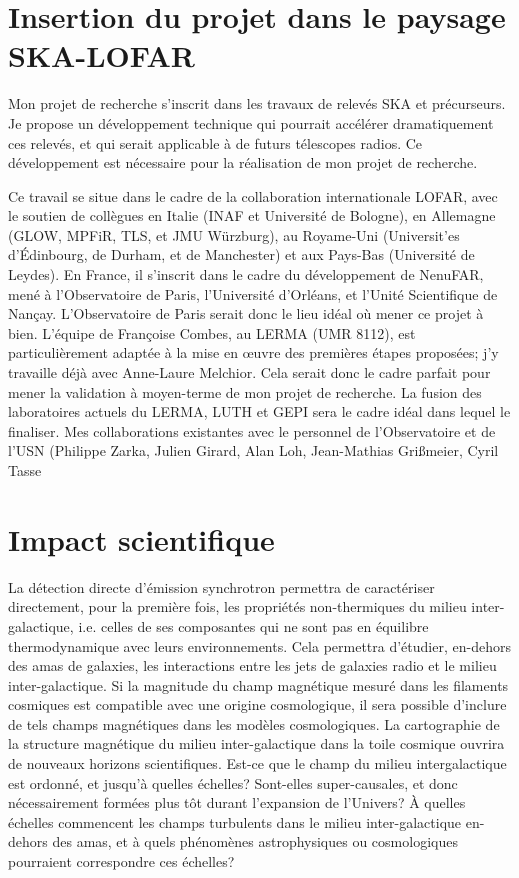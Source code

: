 \newpage

\section{Insertion du projet dans le paysage SKA-LOFAR}

\pg
Mon projet de recherche s'inscrit dans les travaux de relev\'es SKA et pr\'ecurseurs. Je propose un d\'eveloppement technique qui pourrait acc\'el\'erer dramatiquement ces relev\'es, et qui serait applicable \`a de futurs t\'elescopes radios. Ce d\'eveloppement est n\'ecessaire pour la r\'ealisation de mon projet de recherche.

\pg
Ce travail se situe dans le cadre de la collaboration internationale LOFAR, avec le soutien de coll\`egues en Italie (INAF et Universit\'e de Bologne), en Allemagne (GLOW, MPFiR, TLS, et JMU W\"urzburg), au Royame-Uni (Universit'es d'\'Edinbourg, de Durham, et de Manchester) et aux Pays-Bas (Universit\'e de Leydes). En France, il s'inscrit dans le cadre du d\'eveloppement de NenuFAR, men\'e \`a l'Observatoire de Paris, l'Universit\'e d'Orl\'eans, et l'Unit\'e Scientifique de Nan\c{c}ay.  L'Observatoire de Paris serait donc le lieu id\'eal o\`u mener ce projet \`a bien. L'\'equipe de Fran\c{c}oise Combes, au LERMA (UMR 8112), est particuli\`erement adapt\'ee \`a la mise en {\oe}uvre des premi\`eres \'etapes propos\'ees; j'y travaille d\'ej\`a avec Anne-Laure Melchior. Cela serait donc le cadre parfait pour mener la validation \`a moyen-terme de mon projet de recherche. La fusion des laboratoires actuels du LERMA, LUTH et GEPI sera le cadre id\'eal dans lequel le finaliser. Mes collaborations existantes avec le personnel de l'Observatoire et de l'USN (Philippe Zarka, Julien Girard, Alan Loh, Jean-Mathias Gri{\ss}meier, Cyril Tasse %

\section{Impact scientifique}

\pg
La d\'etection directe d'\'emission synchrotron permettra de caract\'eriser directement, pour la premi\`ere fois, les propri\'et\'es non-thermiques du milieu inter-galactique, i.e. celles de ses composantes qui ne sont pas en \'equilibre thermodynamique avec leurs environnements. Cela permettra d'\'etudier, en-dehors des amas de galaxies, les interactions entre les jets de galaxies radio et le milieu inter-galactique. 
Si la magnitude du champ magn\'etique mesur\'e dans les filaments cosmiques est compatible avec une origine cosmologique, il sera possible d'inclure de tels champs magn\'etiques dans les mod\`eles cosmologiques. 
La cartographie de la structure magn\'etique du milieu inter-galactique dans la toile cosmique ouvrira de nouveaux horizons scientifiques. Est-ce que le champ du milieu intergalactique est ordonn\'e, et jusqu'\`a quelles \'echelles? Sont-elles super-causales, et donc n\'ecessairement form\'ees plus t\^ot durant l'expansion de l'Univers? \`A quelles \'echelles commencent les champs turbulents dans le milieu inter-galactique en-dehors des amas, et \`a quels ph\'enom\`enes astrophysiques ou cosmologiques pourraient correspondre ces \'echelles?

